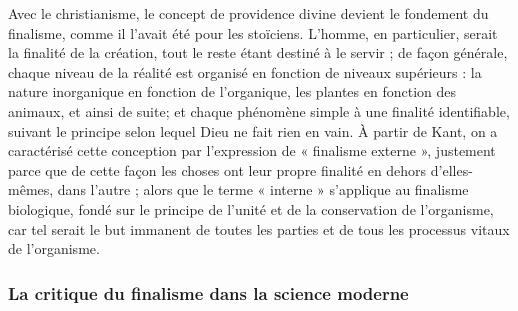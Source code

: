 Avec le christianisme, le concept de
providence divine devient le fondement
du finalisme, comme il l’avait été pour les
stoïciens. L'homme, en particulier, serait
la finalité de la création, tout le reste
étant destiné à le servir ; de façon générale, chaque niveau de la réalité est organisé en fonction de niveaux supérieurs : la
nature inorganique en fonction de l’organique, les plantes en fonction des animaux, et ainsi de suite; et chaque
phénomène simple à une finalité identifiable, suivant le principe selon lequel
Dieu ne fait rien en vain. À partir de
Kant, on a caractérisé cette conception
par l’expression de « finalisme externe »,
justement parce que de cette façon les
choses ont leur propre finalité en dehors
d’elles-mêmes, dans l’autre ; alors que le
terme « interne » s'applique au finalisme
biologique, fondé sur le principe de
l'unité et de la conservation de l’organisme, car tel serait le but immanent de
toutes les parties et de tous les processus
vitaux de l’organisme.

\subsubsection{La critique du finalisme
dans la science moderne}

